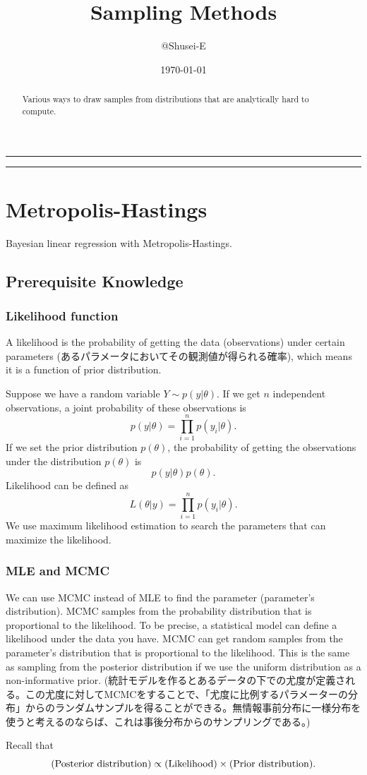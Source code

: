 \documentclass[a4paper,10.5pt,uplatex]{jsarticle}  %
\begin{document}
\title{Sampling Methods}
\author{@Shusei-E}
\date{\today}
\maketitle
\begin{abstract}
Various ways to draw samples from distributions that are analytically hard to compute.
\end{abstract}

\noindent\rule{17.5cm}{1.7pt}
\vspace{-1.3cm}
\tableofcontents
\noindent\rule{17.5cm}{1.7pt}

\section{Metropolis-Hastings}
Bayesian linear regression with Metropolis-Hastings.

\subsection{Prerequisite Knowledge}

\subsubsection{Likelihood function}
A likelihood is the probability of getting the data (observations) under certain parameters (あるパラメータにおいてその観測値が得られる確率), which means it is a function of prior distribution.\par
Suppose we have a random variable $Y \sim p(y|\theta)$. If we get $n$ independent observations, a joint probability of these observations is $$p(y|\theta) = \prod_{i=1}^{n} p(y_i | \theta).$$ If we set the prior distribution $p(\theta)$, the probability of getting the observations under the distribution $p(\theta)$ is $$p(y|\theta)p(\theta).$$Likelihood can be defined as $$L(\theta|y) = \prod_{i=1}^{n} p(y_i|\theta).$$ We use maximum likelihood estimation to search the parameters that can maximize the likelihood.

\subsubsection{MLE and MCMC}
We can use MCMC instead of MLE to find the parameter (parameter's distribution). MCMC samples from the probability distribution that is proportional to the likelihood. To be precise, a statistical model can define a likelihood under the data you have. MCMC can get random samples from the parameter's distribution that is proportional to the likelihood. This is the same as sampling from the posterior distribution if we use the uniform distribution as a non-informative prior. (統計モデルを作るとあるデータの下での尤度が定義される。この尤度に対してMCMCをすることで、「尤度に比例するパラメーターの分布」からのランダムサンプルを得ることができる。無情報事前分布に一様分布を使うと考えるのならば、これは事後分布からのサンプリングである。)\par
Recall that $$({\rm Posterior\ distribution}) \propto ({\rm Likelihood}) \times ({\rm Prior\ distribution}).$$
\end{document}
